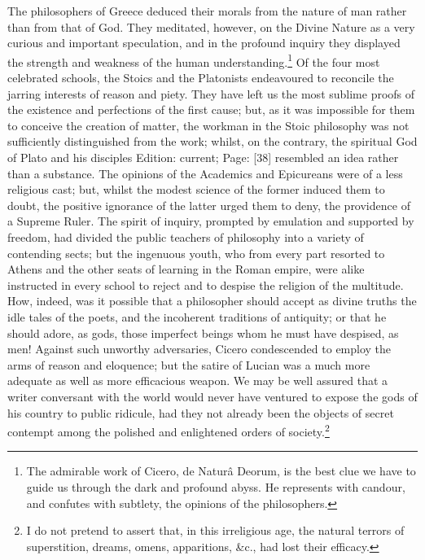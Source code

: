 The philosophers of Greece deduced their morals from the nature of man rather than from that of God. They meditated, however, on the Divine Nature as a very curious and important speculation, and in the profound inquiry they displayed the strength and weakness of the human understanding.\footnote{The admirable work of Cicero, de Naturâ Deorum, is the best clue we have to guide us through the dark and profound abyss. He represents with candour, and confutes with subtlety, the opinions of the philosophers.} Of the four most celebrated schools, the Stoics and the Platonists endeavoured to reconcile the jarring interests of reason and piety. They have left us the most sublime proofs of the existence and perfections of the first cause; but, as it was impossible for them to conceive the creation of matter, the workman in the Stoic philosophy was not sufficiently distinguished from the work; whilst, on the contrary, the spiritual God of Plato and his disciples Edition: current; Page: [38] resembled an idea rather than a substance. The opinions of the Academics and Epicureans were of a less religious cast; but, whilst the modest science of the former induced them to doubt, the positive ignorance of the latter urged them to deny, the providence of a Supreme Ruler. The spirit of inquiry, prompted by emulation and supported by freedom, had divided the public teachers of philosophy into a variety of contending sects; but the ingenuous youth, who from every part resorted to Athens and the other seats of learning in the Roman empire, were alike instructed in every school to reject and to despise the religion of the multitude. How, indeed, was it possible that a philosopher should accept as divine truths the idle tales of the poets, and the incoherent traditions of antiquity; or that he should adore, as gods, those imperfect beings whom he must have despised, as men! Against such unworthy adversaries, Cicero condescended to employ the arms of reason and eloquence; but the satire of Lucian was a much more adequate as well as more efficacious weapon. We may be well assured that a writer conversant with the world would never have ventured to expose the gods of his country to public ridicule, had they not already been the objects of secret contempt among the polished and enlightened orders of society.\footnote{I do not pretend to assert that, in this irreligious age, the natural terrors of superstition, dreams, omens, apparitions, \&c., had lost their efficacy.}

